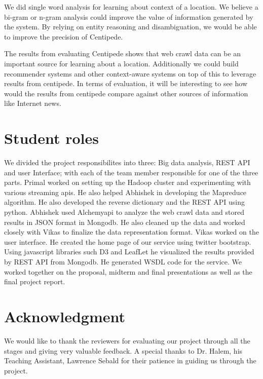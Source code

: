 \documentclass[conference]{IEEEtran}
\begin{document}
We did single word analysis for learning about context of a location. We believe a bi-gram or n-gram analysis could improve the value of information generated by the system. By relying on entity reasoning and disambiguation, we would be able to improve the precision of Centipede.   

The results from evaluating Centipede shows that web crawl data can be an important source for learning about a location. Additionally we could build recommender systems and other context-aware systems on top of this to leverage results from centipede. In terms of evaluation, it will be interesting to see how would the results from centipede compare against other sources of information like Internet news.

\section{Student roles}

We divided the project responsibilites into three: Big data analysis, REST API and user Interface; with each of the team member responsible for one of the three parts. Primal worked on setting up the Hadoop cluster and experimenting with various streaming apis. He also helped Abhishek in developing the Mapreduce algorithm. He also developed the reverse dictionary and the REST API using python. Abhishek used Alchemyapi to analyze the web crawl data and stored results in JSON format in Mongodb. He also cleaned up the data and worked closely with Vikas to finalize the data representation format. Vikas worked on the user interface. He created the home page of our service using twitter bootstrap. Using javascript libraries such D3 and LeafLet he visualized the results provided by REST API from Mongodb. He generated WSDL code for the service. We worked together on the proposal, midterm and final presentations as well as the final project report. 

\section*{Acknowledgment}

We would like to thank the reviewers for evaluating our project through all the stages and giving very valuable feedback. A special thanks to Dr. Halem, his Teaching Assistant, Lawrence Sebald for their patience in guiding us through the project.  

\end{document}
